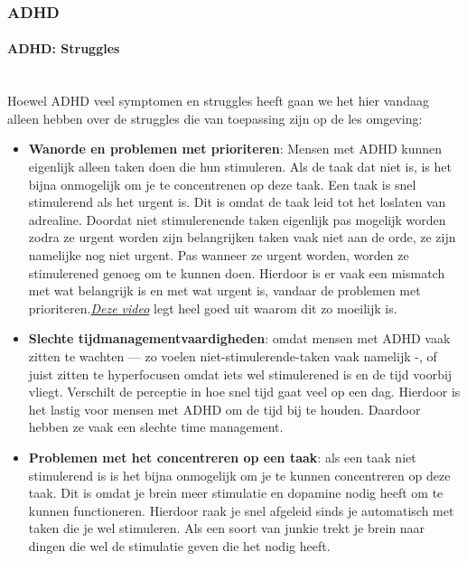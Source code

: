 \documentclass{article}
\begin{document}
            \subsubsection{ADHD}
                \paragraph{ADHD: Struggles}\\
                    Hoewel ADHD veel symptomen en struggles heeft gaan we het hier vandaag alleen hebben over de struggles die van toepassing zijn op de les omgeving:
                    \begin{itemize}
                        \item \textbf{Wanorde en problemen met prioriteren}: 
                            Mensen met ADHD kunnen eigenlijk alleen taken doen die hun stimuleren. Als de taak dat niet is, is het bijna onmogelijk om je te concentrenen op deze taak. Een taak is snel stimulerend als het urgent is. Dit is omdat de taak leid tot het loslaten van adrealine. Doordat niet stimulerenende taken eigenlijk pas mogelijk worden zodra ze urgent worden zijn belangrijken taken vaak niet aan de orde, ze zijn namelijke nog niet urgent. Pas wanneer ze urgent worden, worden ze stimulerened genoeg om te kunnen doen. Hierdoor is er vaak een mismatch met wat belangrijk is en met wat urgent is, vandaar de problemen met prioriteren.\emph{\hyperlink{https://www.youtube.com/watch?v=5xbD9t8cM4M}{Deze video}}\cite{ADHD-video-prioriteiten} legt heel goed uit waarom dit zo moeilijk is.
                        \item \textbf{Slechte tijdmanagementvaardigheden}: 
                            omdat mensen met ADHD vaak zitten te wachten — zo voelen niet-stimulerende-taken vaak namelijk -, of juist zitten te hyperfocusen omdat iets wel stimulerened is en de tijd voorbij vliegt. Verschilt de perceptie in hoe snel tijd gaat veel op een dag. Hierdoor is het lastig voor mensen met ADHD om de tijd bij te houden. Daardoor hebben ze vaak een slechte time management. 
                        \item \textbf{Problemen met het concentreren op een taak}: 
                            als een taak niet stimulerend is is het bijna onmogelijk om je te kunnen concentreren op deze taak. Dit is omdat je brein meer stimulatie en dopamine nodig heeft om te kunnen functioneren. Hierdoor raak je snel afgeleid sinds je automatisch met taken die je wel stimuleren. Als een soort van junkie trekt je brein naar dingen die wel de stimulatie geven die het nodig heeft.

\end{itemize}
\end{document}
